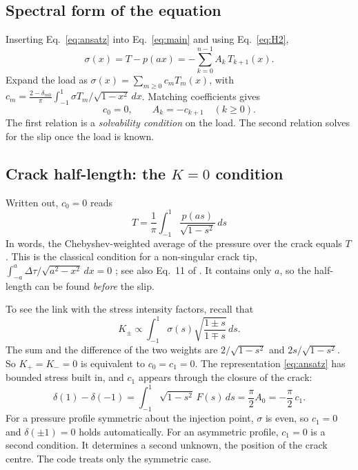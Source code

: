 \documentclass[12pt]{article}
\begin{document}
\subsection{Spectral form of the equation}
Inserting Eq.~\eqref{eq:ansatz} into Eq.~\eqref{eq:main} and using
Eq.~\eqref{eq:H2},
\begin{equation}\label{eq:spectral}
	\sigma(x) = T - p(ax) = -\sum_{k=0}^{n-1} A_k\, T_{k+1}(x).
\end{equation}
Expand the load as $\sigma(x) = \sum_{m\ge0} c_m T_m(x)$, with
$c_m = \frac{2-\delta_{m0}}{\pi}\int_{-1}^{1}\sigma T_m/\sqrt{1-x^2}\,dx$.
Matching coefficients gives
\begin{equation}\label{eq:match}
	c_0 = 0, \qquad A_k = -c_{k+1}\quad (k\ge0).
\end{equation}
The first relation is a \emph{solvability condition} on the load. The second
relation solves for the slip once the load is known.

\subsection{Crack half-length: the \texorpdfstring{$K=0$}{K=0} condition}\label{sec:length}
Written out, $c_0=0$ reads
\begin{equation}\label{eq:length}
	\boxed{\;T = \frac1\pi\int_{-1}^{1}\frac{p(as)}{\sqrt{1-s^2}}\,ds\;}
\end{equation}
In words, the Chebyshev-weighted average of the pressure over the crack equals
$T$. This is the classical condition for a non-singular crack tip,
$\int_{-a}^{a}\Delta\tau/\sqrt{a^2-x^2}\,dx = 0$
\parencite{Rice1968}; see also Eq.~11 of \textcite{ViescaGaragash2018}. It
contains only $a$, so the half-length can be found \emph{before} the slip.

To see the link with the stress intensity factors, recall that
\parencite{Rice1968}
\begin{equation*}
	K_\pm \propto \int_{-1}^{1}\sigma(s)\sqrt{\frac{1\pm s}{1\mp s}}\,ds .
\end{equation*}
The sum and the difference of the two weights are
$2/\sqrt{1-s^2}$ and $2s/\sqrt{1-s^2}$. So $K_+=K_-=0$ is equivalent to
$c_0 = c_1 = 0$. The representation \eqref{eq:ansatz} has bounded stress built
in, and $c_1$ appears through the closure of the crack:
\begin{equation}\label{eq:closure}
	\delta(1)-\delta(-1) = \int_{-1}^{1}\sqrt{1-s^2}\,F(s)\,ds = \frac\pi2 A_0 = -\frac\pi2\,c_1 .
\end{equation}
For a pressure profile symmetric about the injection point, $\sigma$ is even, so
$c_1 = 0$ and $\delta(\pm1)=0$ holds automatically. For an asymmetric profile,
$c_1=0$ is a second condition. It determines a second unknown, the position of
the crack centre. The code treats only the symmetric case.
\end{document}
